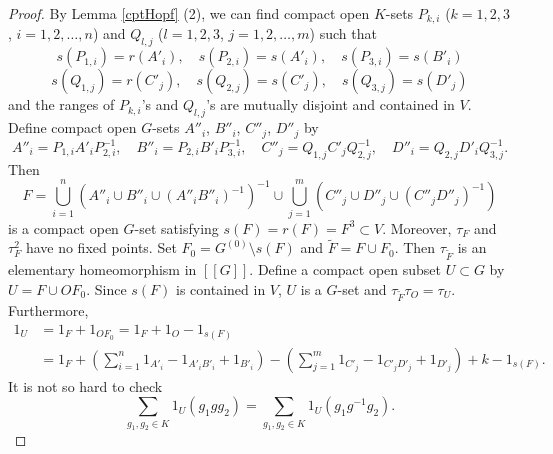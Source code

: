 \documentclass[11pt]{article}
\theoremstyle{definition}
\begin{document}
\begin{proof}
By Lemma \ref{cptHopf} (2), 
we can find compact open $K$-sets $P_{k,i}$ ($k=1,2,3$, $i=1,2,\dots,n$) and 
$Q_{l,j}$ ($l=1,2,3$, $j=1,2,\dots,m$) such that 
\[
s(P_{1,i})=r(A'_i),\quad s(P_{2,i})=s(A'_i),\quad s(P_{3,i})=s(B'_i)
\]
\[
s(Q_{1,j})=r(C'_j),\quad s(Q_{2,j})=s(C'_j),\quad s(Q_{3,j})=s(D'_j)
\]
and the ranges of $P_{k,i}$'s and $Q_{l,j}$'s are 
mutually disjoint and contained in $V$. 
Define compact open $G$-sets $A''_i$, $B''_i$, $C''_j$, $D''_j$ by 
\[
A''_i=P_{1,i}A'_iP_{2,i}^{-1},\quad 
B''_i=P_{2,i}B'_iP_{3,i}^{-1},\quad 
C''_j=Q_{1,j}C'_jQ_{2,j}^{-1},\quad 
D''_i=Q_{2,j}D'_iQ_{3,j}^{-1}. 
\]
Then 
\[
F=\bigcup_{i=1}^n(A''_i\cup B''_i\cup(A''_iB''_i)^{-1})^{-1}
\cup\bigcup_{j=1}^m(C''_j\cup D''_j\cup(C''_jD''_j)^{-1})
\]
is a compact open $G$-set satisfying $s(F)=r(F)=F^3\subset V$. 
Moreover, $\tau_F$ and $\tau_F^2$ have no fixed points. 
Set $F_0=G^{(0)}\setminus s(F)$ and $\widetilde F=F\cup F_0$. 
Then $\tau_{\widetilde F}$ is an elementary homeomorphism in $[[G]]$. 
Define a compact open subset $U\subset G$ by $U=F\cup OF_0$. 
Since $s(F)$ is contained in $V$, 
$U$ is a $G$-set and $\tau_{\tilde F}\tau_O=\tau_U$. 
Furthermore, 
\begin{align*}
1_U&=1_F+1_{OF_0}=1_F+1_O-1_{s(F)} \\
&=1_F+\left(\sum_{i=1}^n1_{A'_i}-1_{A'_iB'_i}+1_{B'_i}\right)
-\left(\sum_{j=1}^m1_{C'_j}-1_{C'_jD'_j}+1_{D'_j}\right)+k-1_{s(F)}. 
\end{align*}
It is not so hard to check 
\[
\sum_{g_1,g_2\in K}1_U(g_1gg_2)
=\sum_{g_1,g_2\in K}1_U(g_1g^{-1}g_2). 
\]
\end{proof}
\end{document}
